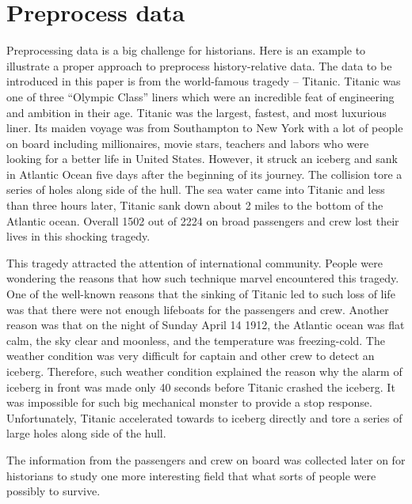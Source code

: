 \documentclass[sigconf]{acmart}
\begin{document}
\section{Preprocess data}
 
\par
Preprocessing data is a big challenge for historians. Here is an example to illustrate a proper approach to preprocess history-relative data. The data to be introduced in this paper is from the world-famous tragedy -- Titanic. Titanic was one of three ``Olympic Class'' liners which were an incredible feat of engineering and ambition in their age. Titanic was the largest, fastest, and most luxurious liner. Its maiden voyage was from Southampton to New York with a lot of people on board including millionaires, movie stars, teachers and labors who were looking for a better life in United States. However, it struck an iceberg and sank in Atlantic Ocean five days after the beginning of its journey. The collision tore a series of holes along side of the hull. The sea water came into Titanic and less than three hours later, Titanic sank down about 2 miles to the bottom of the Atlantic ocean. Overall 1502 out of 2224 on broad passengers and crew lost their lives in this shocking tragedy\cite{C2}. 

\par
This tragedy attracted the attention of international community. People were wondering the reasons that how such technique marvel encountered this tragedy. One of the well-known reasons that the sinking of Titanic led to such loss of life was that there were not enough lifeboats for the passengers and crew\cite{C3}. Another reason was that on the night of Sunday April 14 1912, the Atlantic ocean was flat calm, the sky clear and moonless, and the temperature was freezing-cold\cite{C2}. The weather condition was very difficult for captain and other crew to detect an iceberg. Therefore, such weather condition explained the reason why the alarm of iceberg in front was made only 40 seconds before Titanic crashed the iceberg. It was impossible for such big mechanical monster to provide a stop response. Unfortunately, Titanic accelerated towards to iceberg directly and tore a series of large holes along side of the hull.  

\par
The information from the passengers and crew on board was collected later on for historians to study one more interesting field that what sorts of people were possibly to survive. 
\end{document}

